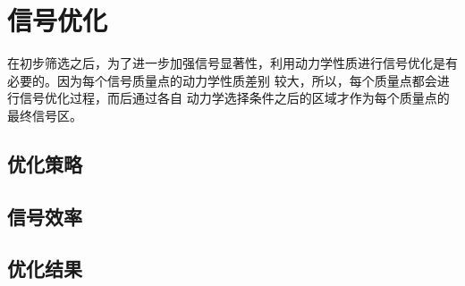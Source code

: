 \chapter{信号优化}\label{chap:signal_optimization}
在初步筛选之后，为了进一步加强信号显著性，利用动力学性质进行信号优化是有必要的。因为每个信号质量点的动力学性质差别
较大，所以，每个质量点都会进行信号优化过程，而后通过各自
动力学选择条件之后的区域才作为每个质量点的最终信号区。

\section{优化策略}

\section{信号效率}


\section{优化结果}
